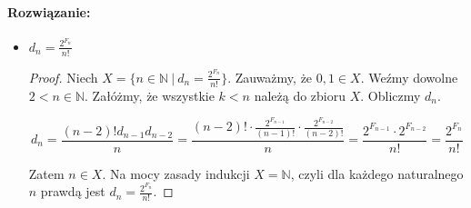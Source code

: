 \documentclass{article}
\newenvironment{rozw}{\paragraph{Rozwiązanie:}}{\hfill}
\begin{document}
\begin{rozw}
\begin{itemize}
\begin{proof}
$$= \frac{ (n+3)(1+ n^2 + 2n)}{n+1} = (n+1)(n+3) = (n+1)^2 + 2(n+1)$$

Z powyższych rachunków wynika, że $n+1 \in X$, a zatem na mocy zasady indukcji matematycznej podany wzór jest prawdziwy dla dowolnego $n \in \mathbb{N}$.

\end{proof}

\item $d_n = \frac{2^{F_n}}{n!}$
\begin{proof}

Niech $X = \lbrace n \in \mathbb{N} \ | \ d_n = \frac{2^{F_n}}{n!} \rbrace$. Zauważmy, że $0,1 \in X$. Weźmy dowolne $2 < n \in \mathbb{N}$. Załóżmy, że wszystkie $k < n$ należą do zbioru $X$. Obliczmy $d_{n}$.

$$d_n = \frac{(n-2)! d_{n-1}d_{n-2}}{n} = \frac{(n-2)! \cdot \frac{2^{F_{n-1}}}{(n-1)!} \cdot \frac{2^{F_{n-2}}}{(n-2)!} } {n} = \frac{ 2^{F_{n-1}} \cdot 2^{F_{n-2}} }{n!} = \frac{2^{F_n}}{n!}$$

Zatem $n \in X$. Na mocy zasady indukcji $X = \mathbb{N}$, czyli dla każdego naturalnego $n$ prawdą jest $d_n = \frac{2^{F_n}}{n!}$.

\end{proof}

\end{itemize}


\end{rozw}
\end{document}
